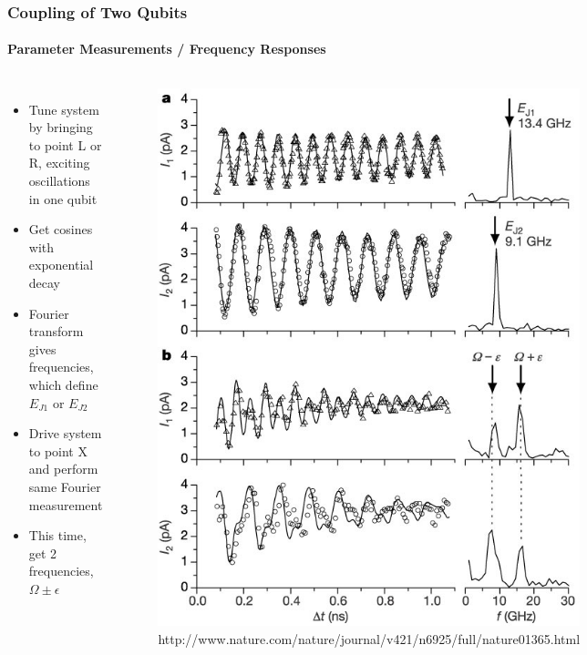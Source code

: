 \documentclass{beamer}
\begin{document}
\begin{frame}
    \frametitle{Coupling of Two Qubits}
    \framesubtitle{Parameter Measurements / Frequency Responses}
    \begin{columns}
            \begin{itemize}
                \fontsize{7}{8}\selectfont
                \item Tune system by bringing to point L or R, exciting oscillations in one qubit
                \item Get cosines with exponential decay
                \item Fourier transform gives frequencies, which define $E_{J1}$ or $E_{J2}$
                \item Drive system to point X and perform same Fourier measurement
                \item This time, get 2 frequencies, $\Omega \pm \epsilon$
            \end{itemize}
            \begin{figure}[ht!]
                \centering
                \includegraphics[height=0.6\textheight]{img/probe-current-osc.jpg}
                \caption{http://www.nature.com/nature/journal/v421/n6925/full/nature01365.html}
            \end{figure}
    \end{columns}
\end{frame}
\end{document}
